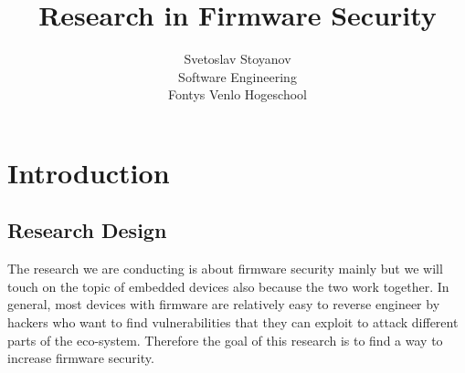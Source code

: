 \documentclass[]{report}
\title{Research in Firmware Security}
\author{Svetoslav Stoyanov \\
	Software Engineering \\
	Fontys Venlo Hogeschool}
\begin{document}
\maketitle
\tableofcontents
\begin{comment}
	In recent years embedded devices have become very popular in many countries worldwide, they are often used in households, factories, and even in infrastructure objects. Their usage is predicted to increase steadily in the next decades. Our focus is that all embedded devices run on Firmware, which is basically computer software that is meant to work with specific hardware. The Firmware is not as secure as we would like it to be, there are many ways of hacking (reverse engineering) it so that one (the hacker) can find how exactly it operates and if there are any holes that can be exploited for benefit or used to harm either the users or the creators of the firmware.
\end{comment}
\chapter{Introduction}
\section{Research Design}
The research we are conducting is about firmware security mainly but we will touch on the topic of embedded devices also because the two work together. In general, most devices with firmware are relatively easy to reverse engineer by hackers who want to find vulnerabilities that they can exploit to attack different parts of the eco-system. Therefore the goal of this research is to find a way to increase firmware security.
\end{document}
